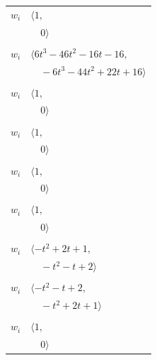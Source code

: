 \documentclass[11pt]{article}
\begin{document}
\begin{longtable}{@{}ll@{}}
$w_i$ & $\langle 1,$\\
 & $\quad 0\rangle$\\
\addlinespace[2pt]
\multicolumn{2}{@{}p{0.97\textwidth}@{}}{$i=47$, $D_i=1$, $\rho_{ij}$: $1{:}1, \allowbreak 2{:}1, \allowbreak 4{:}2, \allowbreak 6{:}1, \allowbreak 13{:}1, \allowbreak 19{:}1, \allowbreak 23{:}1, \allowbreak 31{:}2, \allowbreak 36{:}1, \allowbreak 39{:}1, \allowbreak 45{:}1, \allowbreak 61{:}1, \allowbreak 62{:}1, \allowbreak 64{:}1$}\\
$w_i$ & $\langle 6t^{3}-46t^{2}-16t-16,$\\
 & $\quad -6t^{3}-44t^{2}+22t+16\rangle$\\
\addlinespace[2pt]
\multicolumn{2}{@{}p{0.97\textwidth}@{}}{$i=48$, $D_i=1$, $\rho_{ij}$: $--$}\\
$w_i$ & $\langle 1,$\\
 & $\quad 0\rangle$\\
\addlinespace[2pt]
\multicolumn{2}{@{}p{0.97\textwidth}@{}}{$i=49$, $D_i=1$, $\rho_{ij}$: $--$}\\
$w_i$ & $\langle 1,$\\
 & $\quad 0\rangle$\\
\addlinespace[2pt]
\multicolumn{2}{@{}p{0.97\textwidth}@{}}{$i=50$, $D_i=1$, $\rho_{ij}$: $--$}\\
$w_i$ & $\langle 1,$\\
 & $\quad 0\rangle$\\
\addlinespace[2pt]
\multicolumn{2}{@{}p{0.97\textwidth}@{}}{$i=51$, $D_i=1$, $\rho_{ij}$: $--$}\\
$w_i$ & $\langle 1,$\\
 & $\quad 0\rangle$\\
\addlinespace[2pt]
\multicolumn{2}{@{}p{0.97\textwidth}@{}}{$i=52$, $D_i=1$, $\rho_{ij}$: $19{:}2, \allowbreak 45{:}1, \allowbreak 71{:}2$}\\
$w_i$ & $\langle -t^{2}+2t+1,$\\
 & $\quad -t^{2}-t+2\rangle$\\
\addlinespace[2pt]
\multicolumn{2}{@{}p{0.97\textwidth}@{}}{$i=53$, $D_i=1$, $\rho_{ij}$: $13{:}1, \allowbreak 18{:}1, \allowbreak 87{:}2$}\\
$w_i$ & $\langle -t^{2}-t+2,$\\
 & $\quad -t^{2}+2t+1\rangle$\\
\addlinespace[2pt]
\multicolumn{2}{@{}p{0.97\textwidth}@{}}{$i=54$, $D_i=1$, $\rho_{ij}$: $--$}\\
$w_i$ & $\langle 1,$\\
 & $\quad 0\rangle$\\

\end{longtable}
\end{document}
